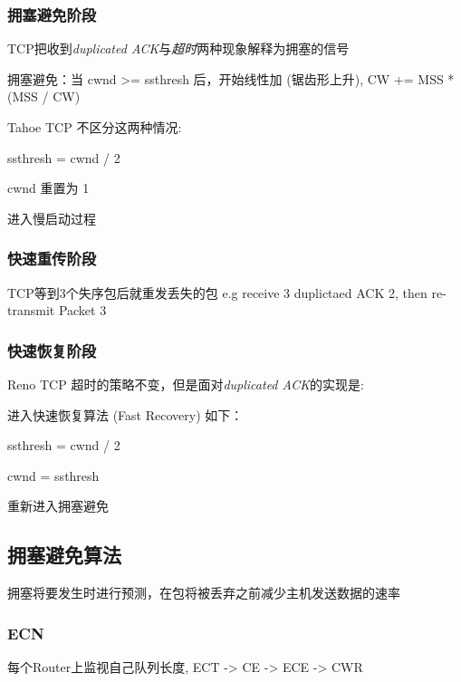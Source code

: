 \documentclass[UTF8,cs4size]{ctexart}
\begin{document}
\subsubsection{拥塞避免阶段}
TCP把收到\textit{duplicated ACK}与\textit{超时}两种现象解释为拥塞的信号

拥塞避免：当 cwnd >= ssthresh 后，开始线性加 (锯齿形上升), CW += MSS * (MSS / CW)

Tahoe TCP 不区分这两种情况:
\begin{compactitem}
  \item ssthresh = cwnd / 2
  \item cwnd 重置为 1
  \item 进入慢启动过程
\end{compactitem}
\subsubsection{快速重传阶段}
TCP等到3个失序包后就重发丢失的包
e.g receive 3 duplictaed ACK 2, then re-transmit Packet 3
\subsubsection{快速恢复阶段}
Reno TCP 超时的策略不变，但是面对\textit{duplicated ACK}的实现是:
\begin{compactitem}
  \item 进入快速恢复算法 (Fast Recovery) 如下：
  \item ssthresh = cwnd / 2
  \item cwnd = ssthresh
  \item 重新进入拥塞避免
\end{compactitem}

\subsection{拥塞避免算法}
拥塞将要发生时进行预测，在包将被丢弃之前减少主机发送数据的速率
\subsubsection{ECN}
每个Router上监视自己队列长度, ECT -> CE -> ECE -> CWR
\end{document}
